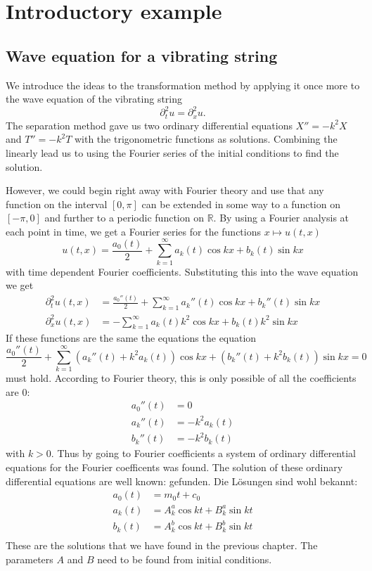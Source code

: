 %
%
%
\section{Introductory example}
\subsection{Wave equation for a vibrating string}
We introduce the ideas to the transformation method by applying it
once more to the wave equation of the vibrating string
\[
\partial_t^2u=\partial_x^2u.
\]
The separation method gave us two ordinary differential equations
$X''=-k^2X$ and $T''=-k^2T$ with the trigonometric functions as
solutions.
Combining the linearly lead us to using the Fourier series of the
initial conditions to find the solution.

However, we could begin right away with Fourier theory and
use that any function on the interval $[0,\pi]$ can be extended
in some way to a function on $[-\pi,0]$ and further to a periodic
function on $\mathbb R$.
By using a Fourier analysis at each point in time, we get a
Fourier series for the functions $x\mapsto u(t,x)$
\[
u(t,x)=\frac{a_0(t)}2+\sum_{k=1}^\infty a_k(t)\cos kx+b_k(t)\sin kx
\]
with time dependent Fourier coefficients.
Substituting this into the wave equation we get
\begin{align*}
\partial_t^2u(t,x)&=\frac{a_0''(t)}2
+\sum_{k=1}^\infty a_k''(t)\cos kx+b_k''(t)\sin kx\\
\partial_x^2u(t,x)&=
-\sum_{k=1}^\infty a_k(t)k^2\cos kx+b_k(t)k^2\sin kx
\end{align*}
If these functions are the same the equations
the equation
\[
\frac{a_0''(t)}2
+\sum_{k=1}^\infty (a_k''(t)+k^2a_k(t))\cos kx+(b_k''(t)+k^2b_k(t))\sin kx=0
\]
must hold.
According to Fourier theory, this is only possible of all the coefficients
are $0$:
\begin{align*}
a_0''(t)&=0\\
a_k''(t)&=-k^2a_k(t)\\
b_k''(t)&=-k^2b_k(t)
\end{align*}
with $k>0$.
Thus by going to Fourier coefficients a system of ordinary differential
equations for the Fourier coefficents was found.
The solution of these ordinary differential equations are well known:
gefunden. Die Lösungen sind wohl bekannt:
\begin{align*}
a_0(t)&=m_0t+c_0\\
a_k(t)&=A^a_k\cos kt+B^a_k\sin kt\\
b_k(t)&=A^b_k\cos kt+B^b_k\sin kt\\
\end{align*}
These are the solutions that we have found in the previous chapter.
The parameters $A$ and $B$ need to be found from initial conditions.

